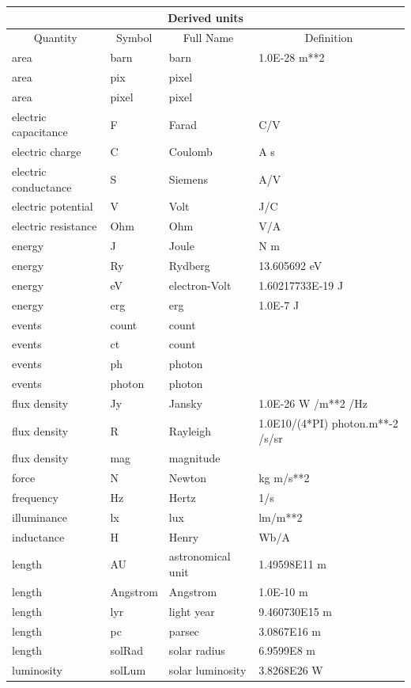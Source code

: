 \documentclass[twoside,11pt,nolof]{starlink}
\begin{document}
\begin{center}
\begin{longtable}{|l|l|l|l|}
\hline
\multicolumn{4}{|c|}{{\large Derived units}} \\ \hline
\multicolumn{1}{|c|}{Quantity} & \multicolumn{1}{|c|}{Symbol} &
\multicolumn{1}{c|}{Full Name} & \multicolumn{1}{c|}{Definition} \\ \hline
area & barn & barn & 1.0E-28 m**2 \\
area & pix & pixel & \\
area & pixel & pixel & \\
electric capacitance & F & Farad & C/V \\
electric charge & C & Coulomb & A s \\
electric conductance & S & Siemens & A/V \\
electric potential & V & Volt & J/C \\
electric resistance & Ohm & Ohm & V/A \\
energy & J & Joule & N m \\
energy & Ry & Rydberg & 13.605692 eV \\
energy & eV & electron-Volt & 1.60217733E-19 J \\
energy & erg & erg & 1.0E-7 J \\
events & count & count & \\
events & ct & count & \\
events & ph & photon & \\
events & photon & photon & \\
flux density & Jy & Jansky & 1.0E-26 W /m**2 /Hz \\
flux density & R & Rayleigh & 1.0E10/(4*PI) photon.m**-2 /s/sr \\
flux density & mag & magnitude & \\
force & N & Newton & kg m/s**2 \\
frequency & Hz & Hertz & 1/s \\
illuminance & lx & lux & lm/m**2 \\
inductance & H & Henry & Wb/A \\
length & AU & astronomical unit & 1.49598E11 m \\
length & Angstrom & Angstrom & 1.0E-10 m \\
length & lyr & light year & 9.460730E15 m \\
length & pc & parsec & 3.0867E16 m \\
length & solRad & solar radius & 6.9599E8 m \\
luminosity & solLum & solar luminosity & 3.8268E26 W \\

\end{longtable}
\end{center}
\end{document}
